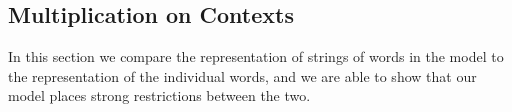 
\subsection{Multiplication on Contexts}
\label{mult-contexts-section}


In this section we compare the representation of strings of words in the model to the representation of the individual words, and we are able to show that our model places strong restrictions between the two. 



